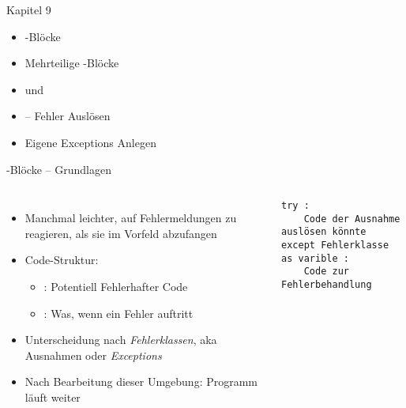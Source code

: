 
\begin{frame}[fragile]{Kapitel 9}
%
\begin{itemize}
\item {}-Blöcke
\item Mehrteilige -Blöcke
\item {} und 
\item {} -- Fehler Auslösen 
\item Eigene Exceptions Anlegen
\end{itemize}
%
\end{frame}


\begin{frame}[fragile]{-Blöcke -- Grundlagen}
%
\begin{columns}[T]
\begin{itemize}
\item Manchmal leichter, auf Fehlermeldungen zu reagieren, als sie im Vorfeld abzufangen
\item Code-Struktur:
	\begin{itemize}
	\item {}: Potentiell Fehlerhafter Code
	\item {}: Was, wenn ein Fehler auftritt
	\end{itemize}
\item Unterscheidung nach \emph{Fehlerklassen}, aka Ausnahmen oder \emph{Exceptions}
\item Nach Bearbeitung dieser Umgebung: Programm läuft weiter
\end{itemize}
%
\begin{codebox}
\begin{verbatim}
try :
    Code der Ausnahme auslösen könnte
except Fehlerklasse as varible :
    Code zur Fehlerbehandlung
\end{verbatim}
\end{codebox}
\end{columns}
%
\end{frame}


